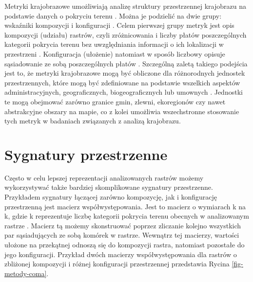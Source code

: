 \documentclass{amuthesis}
\begin{document}
Metryki krajobrazowe umożliwiają analizę struktury przestrzennej
krajobrazu na podstawie danych o pokryciu terenu
\autocite{Pukowiec_Kurda_Sobala_2016}. Można je podzielić na dwie grupy:
wskaźniki kompozycji i konfiguracji
\autocite{solon2002,Pukowiec_Kurda_Sobala_2016}. Celem pierwszej grupy
metryk jest opis kompozycji (udziału) rastrów, czyli zróżnicowania i
liczby płatów poszczególnych kategorii pokrycia terenu bez uwzględniania
informacji o ich lokalizacji w przestrzeni
\autocite{Gustafson1998,solon2002,kozak2014}. Konfiguracja (ułożenie)
natomiast w sposób liczbowy opisuje sąsiadowanie ze sobą poszczególnych
płatów \autocite{Gustafson1998,solon2002,kozak2014}. Szczególną zaletą
takiego podejścia jest to, że metryki krajobrazowe mogą być obliczone
dla różnorodnych jednostek przestrzennych, które mogą być zdefiniowane
na podstawie wszelkich aspektów administracyjnych, geograficznych,
biogeograficznych lub umownych \autocite{Pukowiec_Kurda_Sobala_2016}.
Jednostki te mogą obejmować zarówno granice gmin, zlewni, ekoregionów
czy nawet abstrakcyjne obszary na mapie, co z kolei umożliwia
wszechstronne stosowanie tych metryk w badaniach związanych z analizą
krajobrazu.

\hypertarget{sygnatury-przestrzenne}{%
\section{Sygnatury przestrzenne}\label{sygnatury-przestrzenne}}

Często w celu lepszej reprezentacji analizowanych rastrów możemy
wykorzystywać także bardziej skomplikowane sygnatury przestrzenne.
Przykładem sygnatury łączącej zarówno kompozycję, jak i konfigurację
przestrzenną jest macierz współwystępowania. Jest to macierz o wymiarach
k na k, gdzie k reprezentuje liczbę kategorii pokrycia terenu obecnych w
analizowanym rastrze \autocite{Haralick_1973,Jasiewicz_GeoPAT}. Macierz
tą możemy skonstruować poprzez zliczanie kolejno wszystkich par
sąsiadujących ze sobą komórek w rastrze. Wewnątrz tej macierzy, wartości
ułożone na przekątnej odnoszą się do kompozycji rastra, natomiast
pozostałe do jego konfiguracji. Przykład dwóch macierzy
współwystępowania dla rastrów o zbliżonej kompozycji i różnej
konfiguracji przestrzennej przedstawia Rycina \ref{fig-metody-coma}.
\end{document}
